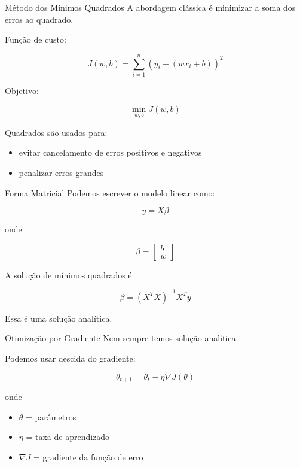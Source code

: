 \documentclass{beamer}
\begin{document}

\begin{frame}{Método dos Mínimos Quadrados}
    A abordagem clássica é minimizar a soma dos erros ao quadrado.
    
    Função de custo:
    
    \[
    J(w,b) =
    \sum_{i=1}^{n}
    (y_i - (wx_i + b))^2
    \]
    
    Objetivo:
    
    \[
    \min_{w,b} J(w,b)
    \]
    
    Quadrados são usados para:
    
    \begin{itemize}
        \item evitar cancelamento de erros positivos e negativos
        \item penalizar erros grandes
    \end{itemize}
\end{frame}


\begin{frame}{Forma Matricial}
    Podemos escrever o modelo linear como:
    
    \[
    y = X\beta
    \]
    
    onde
    
    \[
    \beta =
    \begin{bmatrix}
        b \\
        w
    \end{bmatrix}
    \]
    
    A solução de mínimos quadrados é
    
    \[
    \beta = (X^T X)^{-1} X^T y
    \]
    
    Essa é uma solução analítica.
\end{frame}


\begin{frame}{Otimização por Gradiente}
    Nem sempre temos solução analítica.
    
    Podemos usar descida do gradiente:
    
    \[
    \theta_{t+1}
    =
    \theta_t
    -
    \eta \nabla J(\theta)
    \]
    
    onde
    
    \begin{itemize}
        \item $\theta$ = parâmetros
        \item $\eta$ = taxa de aprendizado
        \item $\nabla J$ = gradiente da função de erro
    \end{itemize}
\end{frame}
\end{document}
